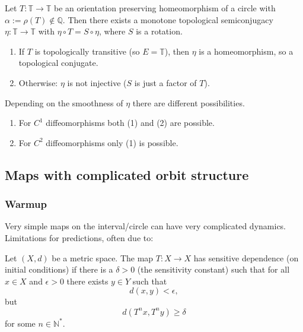 \documentclass{article}
\newcommand*{\N}{\mathbb{N}}
\newcommand*{\Q}{\mathbb{Q}}
\newcommand*{\T}{\mathbb{T}}
\newcommand*{\Ns}{\N^*}
\begin{document}
\begin{thm}
    Let $T:\T\to\T$ be an orientation preserving homeomorphism of a circle with $\alpha := \rho(T)\notin\Q$. Then there exists a monotone topological semiconjugacy $\eta:\T\to\T$ with $\eta\circ T=S\circ \eta$, where $S$ is a rotation.

    \begin{enumerate}
        \item If $T$ is topologically transitive (so $E = \T$), then $\eta$ is a homeomorphism, so a topological conjugate.

        \item Otherwise: $\eta$ is not injective ($S$ is just a factor of $T$).
    \end{enumerate}
\end{thm}

\begin{thm}
    Depending on the smoothness of $\eta$ there are different possibilities.
    \begin{enumerate}
        \item For $C^1$ diffeomorphisms both (1) and (2) are possible.

        \item For $C^2$ diffeomorphisms only (1) is possible.
    \end{enumerate}
\end{thm}

\subsection{Maps with complicated orbit structure}

\subsubsection{Warmup}

Very simple maps on the interval/circle can have very complicated dynamics.\\
Limitations for predictions, often due to:

\begin{defin}
    Let $(X,d)$ be a metric space. The map $T:X\to X$ has sensitive dependence (on initial conditions) if there is a $\delta > 0$ (the sensitivity constant) such that for all $x\in X$ and $\epsilon > 0$ there exists $y\in Y$ such that
    $$d(x,y)< \epsilon,$$
    but
    $$d(T^nx,T^ny) \geq \delta$$
    for some $n\in\Ns$.
\end{defin}
\end{document}
